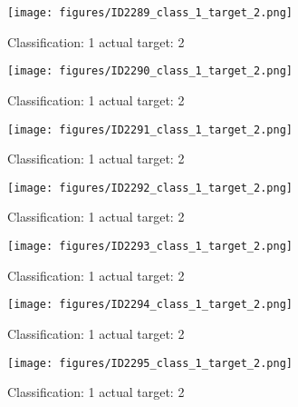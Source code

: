 \begin{figure}[h!]
\begin{center}
\texttt{[image: figures/ID2289\_class\_1\_target\_2.png]}
\end{center}
\caption{ Classification: 1 actual target: 2}
\label{fig:ID2289_class_1_target_2}
\end{figure}
\begin{figure}[h!]
\begin{center}
\texttt{[image: figures/ID2290\_class\_1\_target\_2.png]}
\end{center}
\caption{ Classification: 1 actual target: 2}
\label{fig:ID2290_class_1_target_2}
\end{figure}
\begin{figure}[h!]
\begin{center}
\texttt{[image: figures/ID2291\_class\_1\_target\_2.png]}
\end{center}
\caption{ Classification: 1 actual target: 2}
\label{fig:ID2291_class_1_target_2}
\end{figure}
\begin{figure}[h!]
\begin{center}
\texttt{[image: figures/ID2292\_class\_1\_target\_2.png]}
\end{center}
\caption{ Classification: 1 actual target: 2}
\label{fig:ID2292_class_1_target_2}
\end{figure}
\begin{figure}[h!]
\begin{center}
\texttt{[image: figures/ID2293\_class\_1\_target\_2.png]}
\end{center}
\caption{ Classification: 1 actual target: 2}
\label{fig:ID2293_class_1_target_2}
\end{figure}
\begin{figure}[h!]
\begin{center}
\texttt{[image: figures/ID2294\_class\_1\_target\_2.png]}
\end{center}
\caption{ Classification: 1 actual target: 2}
\label{fig:ID2294_class_1_target_2}
\end{figure}
\begin{figure}[h!]
\begin{center}
\texttt{[image: figures/ID2295\_class\_1\_target\_2.png]}
\end{center}
\caption{ Classification: 1 actual target: 2}
\label{fig:ID2295_class_1_target_2}
\end{figure}
